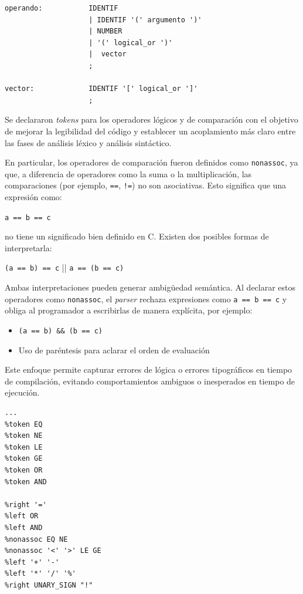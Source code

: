 \documentclass[12pt,a4paper]{article}
\begin{document}
\begin{lstlisting}
operando:           IDENTIF                                            
                    | IDENTIF '(' argumento ')'                         
                    | NUMBER                                            
                    | '(' logical_or ')'                                
                    |  vector                                           
                    ;

vector:             IDENTIF '[' logical_or ']'
                    ;
\end{lstlisting}
\noindent Se declararon \textit{tokens} para los operadores lógicos y de comparación con el objetivo 
de mejorar la legibilidad del código y establecer un acoplamiento más claro entre las fases de 
análisis léxico y análisis sintáctico.

\noindent En particular, los operadores de comparación fueron definidos como \texttt{nonassoc}, 
ya que, a diferencia de operadores como la suma o la multiplicación, las comparaciones 
(por ejemplo, \texttt{==}, \texttt{!=}) no son asociativas. Esto significa que una expresión como:
\begin{center}
\texttt{a == b == c}
\end{center}
\noindent
no tiene un significado bien definido en C. Existen dos posibles formas de interpretarla:

\begin{center}
\texttt{(a == b) == c} || \texttt{a == (b == c)}
\end{center}

\noindent Ambas interpretaciones pueden generar ambigüedad semántica. Al declarar estos operadores 
como \texttt{nonassoc}, el \textit{parser} rechaza expresiones como \texttt{a == b == c} y obliga 
al programador a escribirlas de manera explícita, por ejemplo:

\begin{itemize}
    \item \texttt{(a == b) \&\& (b == c)}
    \item Uso de paréntesis para aclarar el orden de evaluación
\end{itemize}

\noindent Este enfoque permite capturar errores de lógica o errores tipográficos en tiempo de 
compilación, evitando comportamientos ambiguos o inesperados en tiempo de ejecución.
\begin{lstlisting}
...
%token EQ
%token NE
%token LE
%token GE
%token OR
%token AND

%right '='                              
%left OR                               
%left AND                               
%nonassoc EQ NE                         
%nonassoc '<' '>' LE GE                 
%left '+' '-'                           
%left '*' '/' '%'                       
%right UNARY_SIGN "!"                   
\end{lstlisting}
\end{document}
